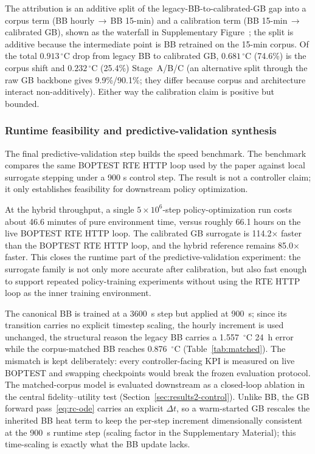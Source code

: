 The attribution is an additive split of the legacy-BB-to-calibrated-GB gap into a corpus term (BB hourly\,$\to$\,BB 15-min) and a calibration term (BB 15-min\,$\to$\,calibrated GB), shown as the waterfall in Supplementary Figure~; the split is additive because the intermediate point is BB retrained on the 15-min corpus. Of the total $0.913\,^\circ$C drop from legacy BB to calibrated GB, $0.681\,^\circ$C (74.6\%) is the corpus shift and $0.232\,^\circ$C (25.4\%) Stage~A/B/C (an alternative split through the raw GB backbone gives 9.9\%/90.1\%; they differ because corpus and architecture interact non-additively). Either way the calibration claim is positive but bounded.

\subsubsection{Runtime feasibility and predictive-validation synthesis}
\label{ssec:block1-runtime}

The final predictive-validation step builds the speed benchmark. The benchmark compares the same BOPTEST RTE HTTP loop used by the paper against local surrogate stepping under a 900 s control step. The result is not a controller claim; it only establishes feasibility for downstream policy optimization.





At the hybrid throughput, a single \(5\times10^6\)-step policy-optimization run costs about 46.6 minutes of pure environment time, versus roughly 66.1 hours on the live BOPTEST RTE HTTP loop. The calibrated GB surrogate is 114.2$\times$ faster than the BOPTEST RTE HTTP loop, and the hybrid reference remains 85.0$\times$ faster. This closes the runtime part of the predictive-validation experiment: the surrogate family is not only more accurate after calibration, but also fast enough to support repeated policy-training experiments without using the RTE HTTP loop as the inner training environment.


\label{ssec:block1-stepsize}

The canonical BB is trained at a 3600~s step but applied at 900~s; since its transition carries no explicit timestep scaling, the hourly increment is used unchanged, the structural reason the legacy BB carries a 1.557~$^\circ$C 24~h error while the corpus-matched BB reaches 0.876~$^\circ$C (Table~\ref{tab:matched}). The mismatch is kept deliberately: every controller-facing KPI is measured on live BOPTEST and swapping checkpoints would break the frozen evaluation protocol. The matched-corpus model is evaluated downstream as a closed-loop ablation in the central fidelity--utility test (Section~\ref{sec:results2-control}). Unlike BB, the GB forward pass~\eqref{eq:rc-ode} carries an explicit \(\Delta t\), so a warm-started GB rescales the inherited BB heat term to keep the per-step increment dimensionally consistent at the 900~s runtime step (scaling factor in the Supplementary Material); this time-scaling is exactly what the BB update lacks.


